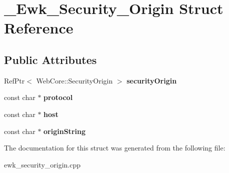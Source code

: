 \hypertarget{struct__Ewk__Security__Origin}{\section{\+\_\+\+Ewk\+\_\+\+Security\+\_\+\+Origin Struct Reference}
\label{struct__Ewk__Security__Origin}
}
\subsection*{Public Attributes}
\begin{DoxyCompactItemize}
\item 
\hypertarget{struct__Ewk__Security__Origin_acb3083368e4c7d86346639ceabf187dc}{Ref\+Ptr$<$ Web\+Core\+::\+Security\+Origin $>$ {\bfseries security\+Origin}}\label{struct__Ewk__Security__Origin_acb3083368e4c7d86346639ceabf187dc}

\item 
\hypertarget{struct__Ewk__Security__Origin_a487e990ae2a741339917ed6c28cf0c3a}{const char $\ast$ {\bfseries protocol}}\label{struct__Ewk__Security__Origin_a487e990ae2a741339917ed6c28cf0c3a}

\item 
\hypertarget{struct__Ewk__Security__Origin_aa7709dfe8fded0d7930bc209788f683b}{const char $\ast$ {\bfseries host}}\label{struct__Ewk__Security__Origin_aa7709dfe8fded0d7930bc209788f683b}

\item 
\hypertarget{struct__Ewk__Security__Origin_a29fa9c10ecd312b687c377612ba883e1}{const char $\ast$ {\bfseries origin\+String}}\label{struct__Ewk__Security__Origin_a29fa9c10ecd312b687c377612ba883e1}

\end{DoxyCompactItemize}


The documentation for this struct was generated from the following file\+:\begin{DoxyCompactItemize}
\item 
ewk\+\_\+security\+\_\+origin.\+cpp\end{DoxyCompactItemize}
